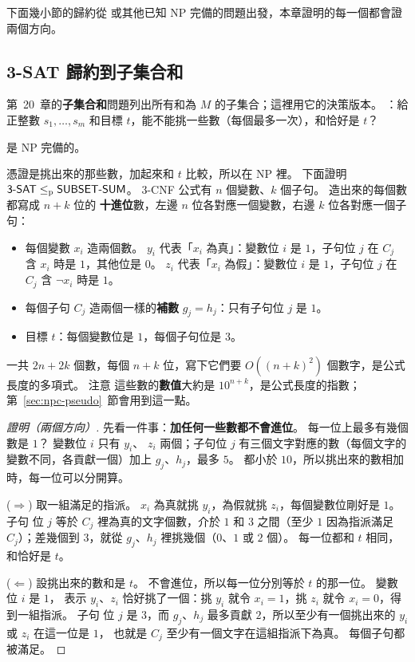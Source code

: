 下面幾小節的歸約從  或其他已知 NP 完備的問題出發，本章證明的每一個都會證兩個方向。

\subsection{3-SAT 歸約到子集合和}
\label{sec:npc-subset}

第~20~章的\textbf{子集合和}問題列出所有和為 $M$ 的子集合；這裡用它的決策版本。 ：給
正整數 $s_1, \ldots, s_m$ 和目標 $t$，能不能挑一些數（每個最多一次），和恰好是 $t$？

\begin{theorem}
\label{thm:npc-subset}
 是 NP 完備的。
\end{theorem}

憑證是挑出來的那些數，加起來和 $t$ 比較，所以在 NP 裡。 下面證明 $\textsf{3-SAT} \le_{\mathrm{p}}
\textsf{SUBSET-SUM}$。 3-CNF 公式有 $n$ 個變數、$k$ 個子句。 造出來的每個數都寫成 $n + k$ 位的
\textbf{十進位}數，左邊 $n$ 位各對應一個變數，右邊 $k$ 位各對應一個子句：

\begin{itemize}
\item 每個變數 $x_i$ 造兩個數。 $y_i$ 代表「$x_i$ 為真」：變數位 $i$ 是 $1$，子句位 $j$ 在 $C_j$ 含
$x_i$ 時是 $1$，其他位是 $0$。 $z_i$ 代表「$x_i$ 為假」：變數位 $i$ 是 $1$，子句位 $j$ 在 $C_j$ 含
$\neg x_i$ 時是 $1$。
\item 每個子句 $C_j$ 造兩個一樣的\textbf{補數} $g_j = h_j$：只有子句位 $j$ 是 $1$。
\item 目標 $t$：每個變數位是 $1$，每個子句位是 $3$。
\end{itemize}

一共 $2n + 2k$ 個數，每個 $n + k$ 位，寫下它們要 $O((n + k)^2)$ 個數字，是公式長度的多項式。 注意
這些數的\textbf{數值}大約是 $10^{n+k}$，是公式長度的指數；第~\ref{sec:npc-pseudo}~節會用到這一點。

\begin{proof}[證明（兩個方向）]
先看一件事：\textbf{加任何一些數都不會進位}。 每一位上最多有幾個數是 $1$？ 變數位 $i$ 只有 $y_i$、
$z_i$ 兩個；子句位 $j$ 有三個文字對應的數（每個文字的變數不同，各貢獻一個）加上 $g_j$、$h_j$，最多
$5$。 都小於 $10$，所以挑出來的數相加時，每一位可以分開算。

($\Rightarrow$) 取一組滿足的指派。 $x_i$ 為真就挑 $y_i$，為假就挑 $z_i$，每個變數位剛好是 $1$。 子句
位 $j$ 等於 $C_j$ 裡為真的文字個數，介於 $1$ 和 $3$ 之間（至少 $1$ 因為指派滿足 $C_j$）；差幾個到
$3$，就從 $g_j$、$h_j$ 裡挑幾個（$0$、$1$ 或 $2$ 個）。 每一位都和 $t$ 相同，和恰好是 $t$。

($\Leftarrow$) 設挑出來的數和是 $t$。 不會進位，所以每一位分別等於 $t$ 的那一位。 變數位 $i$ 是 $1$，
表示 $y_i$、$z_i$ 恰好挑了一個：挑 $y_i$ 就令 $x_i = 1$，挑 $z_i$ 就令 $x_i = 0$，得到一組指派。 子句
位 $j$ 是 $3$，而 $g_j$、$h_j$ 最多貢獻 $2$，所以至少有一個挑出來的 $y_i$ 或 $z_i$ 在這一位是 $1$，
也就是 $C_j$ 至少有一個文字在這組指派下為真。 每個子句都被滿足。
\end{proof}

